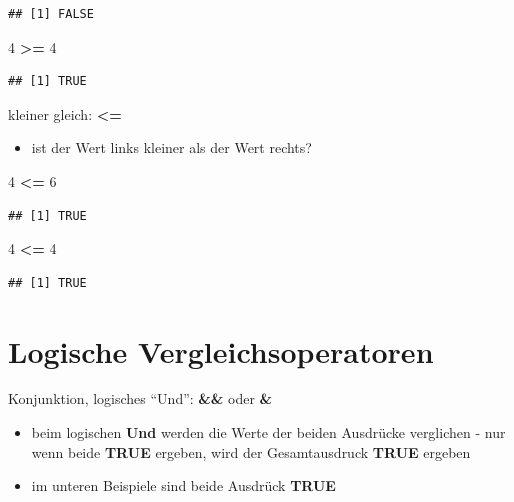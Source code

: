 \documentclass[]{book}
\newenvironment{Shaded}{\begin{snugshade}}{\end{snugshade}}
\newcommand{\DecValTok}[1]{\textcolor[rgb]{0.00,0.00,0.81}{#1}}
\newcommand{\StringTok}[1]{\textcolor[rgb]{0.31,0.60,0.02}{#1}}
\newcommand{\OperatorTok}[1]{\textcolor[rgb]{0.81,0.36,0.00}{\textbf{#1}}}
\providecommand{\tightlist}{%
  \setlength{\itemsep}{0pt}\setlength{\parskip}{0pt}}
\begin{document}
\begin{verbatim}
## [1] FALSE
\end{verbatim}

\begin{Shaded}
\begin{Highlighting}[]
\DecValTok{4} \OperatorTok{>=}\StringTok{ }\DecValTok{4}
\end{Highlighting}
\end{Shaded}

\begin{verbatim}
## [1] TRUE
\end{verbatim}

kleiner gleich: \textbf{\textless{}=}

\begin{itemize}
\tightlist
\item
  ist der Wert links kleiner als der Wert rechts?
\end{itemize}

\begin{Shaded}
\begin{Highlighting}[]
\DecValTok{4} \OperatorTok{<=}\StringTok{ }\DecValTok{6}
\end{Highlighting}
\end{Shaded}

\begin{verbatim}
## [1] TRUE
\end{verbatim}

\begin{Shaded}
\begin{Highlighting}[]
\DecValTok{4} \OperatorTok{<=}\StringTok{ }\DecValTok{4}
\end{Highlighting}
\end{Shaded}

\begin{verbatim}
## [1] TRUE
\end{verbatim}

\section{Logische
Vergleichsoperatoren}\label{logische-vergleichsoperatoren}

Konjunktion, logisches ``Und'': \textbf{\&\&} oder \textbf{\&}

\begin{itemize}
\tightlist
\item
  beim logischen \textbf{Und} werden die Werte der beiden Ausdrücke
  verglichen - nur wenn beide \textbf{TRUE} ergeben, wird der
  Gesamtausdruck \textbf{TRUE} ergeben
\item
  im unteren Beispiele sind beide Ausdrück \textbf{TRUE}
\end{itemize}
\end{document}
